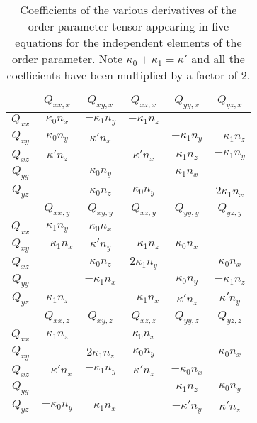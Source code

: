 {\small
\begin{table}
\begin{center}

\begin{tabular}{|c|ccccc|}

\hline
&
$Q_{xx,x}$ & $Q_{xy,x}$ & $Q_{xz,x}$ & $Q_{yy,x}$ & $Q_{yz,x}$ \\
\hline
$Q_{xx}$ &
$\kappa_0 n_x$ & $-\kappa_1 n_y$ & $-\kappa_1 n_z$ & & \\
$Q_{xy}$ &
$\kappa_0 n_y$ & $\kappa' n_x$ & & $-\kappa_1 n_y$  & $-\kappa_1 n_z$  \\
$Q_{xz}$ &
$\kappa' n_z$ & & $\kappa' n_x$ & $\kappa_1 n_z$ & $-\kappa_1 n_y$ \\
$Q_{yy}$ &
 & $\kappa_0 n_y$ & & $\kappa_1 n_x$ & \\
$Q_{yz}$ &
 & $\kappa_0 n_z$ & $\kappa_0 n_y$ & & $2\kappa_1 n_x$ \\
\hline
\hline
&
$Q_{xx,y}$ & $Q_{xy,y}$ & $Q_{xz,y}$ & $Q_{yy,y}$ & $Q_{yz,y}$ \\
\hline
$Q_{xx}$ &
$\kappa_1 n_y$ & $\kappa_0 n_x$ & & & \\
$Q_{xy}$ &
$-\kappa_1 n_x$ & $\kappa' n_y$ & $-\kappa_1 n_z$ & $\kappa_0 n_x$ & \\
$Q_{xz}$ &
 & $\kappa_0 n_z$ & $2\kappa_1 n_y$ & & $\kappa_0 n_x$ \\
$Q_{yy}$ &
 & $-\kappa_1 n_x$ & & $\kappa_0 n_y$ & $-\kappa_1 n_z$\\
$Q_{yz}$ &
$\kappa_1 n_z$ & & $-\kappa_1 n_x$ & $\kappa' n_z$ & $\kappa' n_y$\\
\hline
\hline
&
$Q_{xx,z}$ & $Q_{xy,z}$ & $Q_{xz,z}$ & $Q_{yy,z}$ & $Q_{yz,z}$ \\
\hline
$Q_{xx}$ &
$\kappa_1 n_z$ & & $\kappa_0 n_x$ & & \\
$Q_{xy}$ &
 & $2\kappa_1 n_z$ & $\kappa_0 n_y$ & & $\kappa_0 n_x$ \\
$Q_{xz}$ &
$-\kappa' n_x$ & $-\kappa_1 n_y$ & $\kappa' n_z$ & $-\kappa_0 n_x$ & \\
$Q_{yy}$ &
 & & & $\kappa_1 n_z$ & $\kappa_0 n_y$  \\
$Q_{yz}$ &
$-\kappa_0 n_y$ & $-\kappa_1 n_x$ & & $-\kappa' n_y$ & $\kappa' n_z$ \\
\hline
\end{tabular}
\end{center}
\caption{Coefficients of the various derivatives of the order parameter
tensor appearing in five equations for the independent elements of the
order parameter. Note $\kappa_0 + \kappa_1 = \kappa'$ and all the
coefficients have been multiplied by a factor of 2.}
\label{tab:cholesteric_bcs}
\end{table} 
}
 
